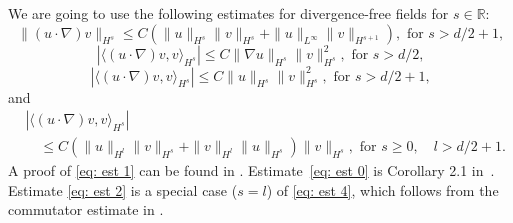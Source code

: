 \documentclass{amsart}
\begin{document}
We are going to use the following estimates for divergence-free fields for $s\in \mathbb{R}$:
\begin{equation}
\label{eq: est 1}
    \|(u\cdot \nabla) v\|_{H^s} \leq C (\|u\|_{H^s} \|v\|_{H^s} + \|u\|_{L^{\infty}} \|v\|_{H^{s+1}}), \text{ for $s>d/2+1$,}
\end{equation}
\begin{equation}\label{eq: est 0}
 |\langle (u\cdot \nabla)v,v \rangle_{H^s} |\leq C \|\nabla u\|_{H^s} \|v\|_{H^s}^2, \text{ for $s>d/2$,}
\end{equation}
\begin{equation}
    \label{eq: est 2}
    |\langle (u\cdot \nabla)v,v \rangle_{H^s} | \leq C \|u\|_{H^s} \|v\|_{H^s}^2,\text{ for $s>d/2+1$,}
\end{equation}
and
\begin{equation}
\begin{aligned}
    \label{eq: est 4}
    &|\langle (u\cdot \nabla)v,v \rangle_{H^s} |\\
		&\quad\leq C (\|u\|_{H^l} \|v\|_{H^s} + \|v\|_{H^l} \|u\|_{H^s}) \|v\|_{H^s}, \text{ for $s\geq 0,\quad l>d/2+1$.}
		\end{aligned}
\end{equation}
A proof of \eqref{eq: est 1} can be found in \cite[Proposition A.29]{Bedrossian.2022}. Estimate~\eqref{eq: est 0} is Corollary 2.1 in~\cite{Feff.2014}. Estimate \eqref{eq: est 2} is a special case ($s=l$) of \eqref{eq: est 4}, which follows from the commutator estimate in \cite{Kato.1988}.
\end{document}
